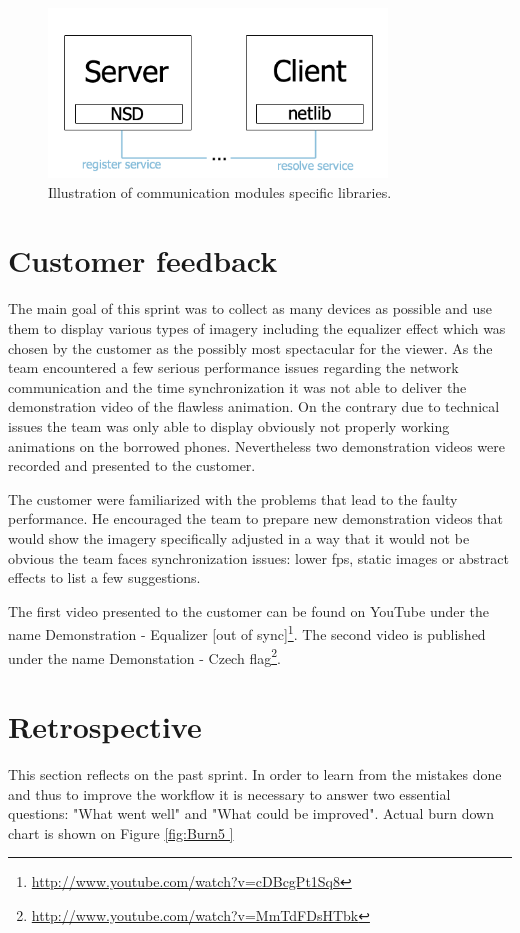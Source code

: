 \begin{figure}[H]
	\centering
		\includegraphics[width=9cm]{sprint5/com.png}
	\caption{Illustration of communication modules specific libraries.}
	\label{fig:Communication modules }
\end{figure}

\section{Customer feedback} \label{txt:sprint5_customerfeedback}
The main goal of this sprint was to collect as many devices as possible and use them to display various types of imagery including the equalizer effect which was chosen by the customer as the possibly most spectacular for the viewer. As the team encountered a few serious performance issues regarding the network communication and the time synchronization it was not able to deliver the demonstration video of the flawless animation. On the contrary due to technical issues the team was only able to display obviously not properly working animations on the borrowed phones. Nevertheless two demonstration videos were recorded and presented to the customer.

The customer were familiarized with the problems that lead to the faulty performance. He encouraged the team to prepare new demonstration videos that would show the imagery specifically adjusted in a way that it would not be obvious the team faces synchronization issues: lower fps, static images or abstract effects to list a few suggestions.

The first video presented to the customer can be found on YouTube under the name Demonstration - Equalizer [out of sync]\footnote{\url{http://www.youtube.com/watch?v=cDBcgPt1Sq8}}. 
The second video is published under the name Demonstation - Czech flag\footnote{\url{http://www.youtube.com/watch?v=MmTdFDsHTbk}}.

\section{Retrospective}
This section reflects on the past sprint. In order to learn from the mistakes done and thus to improve the workflow it is necessary to answer two essential questions: "What went well" and "What could be improved". Actual burn down chart is shown on Figure \ref{fig:Burn5 }

